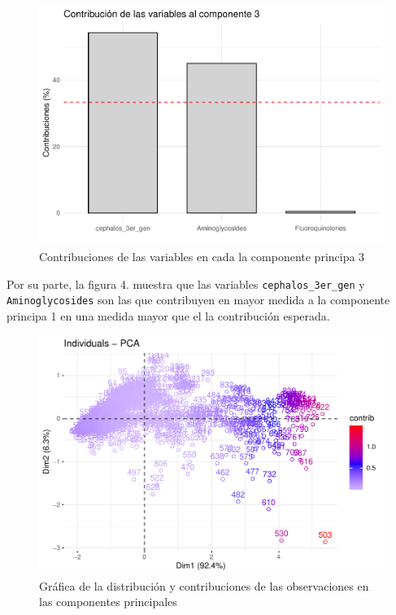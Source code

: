 \documentclass[
]{article}
\begin{document}
\begin{figure}
\centering
\includegraphics{2_actividad_PCA_files/figure-latex/GRÁFICA contribución 3-1.pdf}
\caption{Contribuciones de las variables en cada la componente principa
3}
\end{figure}

Por su parte, la figura 4. muestra que las variables
\texttt{cephalos\_3er\_gen} y \texttt{Aminoglycosides} son las que
contribuyen en mayor medida a la componente principa 1 en una medida
mayor que el la contribución esperada.

\begin{figure}
\centering
\includegraphics{2_actividad_PCA_files/figure-latex/GRÁFICA individuos por contribución 2-1.pdf}
\caption{Gráfica de la distribución y contribuciones de las
observaciones en las componentes principales}
\end{figure}
\end{document}
